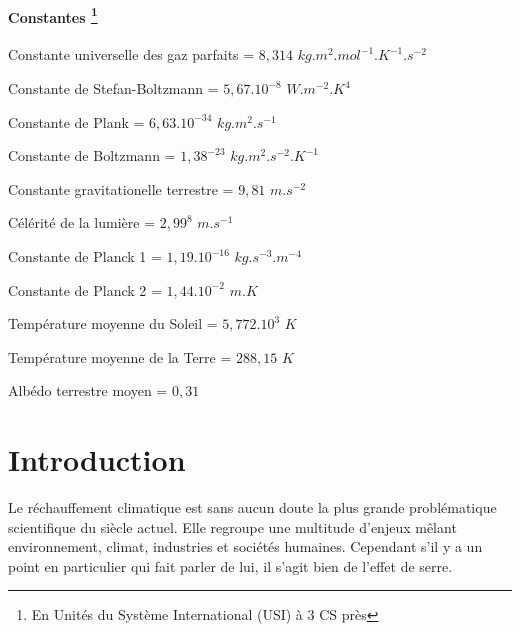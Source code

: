 \documentclass[a4paper, 12pt]{report} %
\begin{document}
\begin{description}
	\subsubsection*{Constantes \footnote{En Unités du Système International (USI) à 3 CS près}}
	\item[\boldmath{$R$}:] Constante universelle des gaz parfaits = $8,314$ $kg.m^2.mol^{-1}.K^{-1}.s^{-2}$
	\item[\boldmath{$\sigma$}:] Constante de Stefan-Boltzmann = $5,67.10^{-8}$ $W.m^{-2}.K^{4}$
	\item[\boldmath{$h$}:] Constante de Plank = $6,63.10^{-34}$ $kg.m^2.s^{-1}$
 	\item[\boldmath{$k_B$}:] Constante de Boltzmann = $1,38^{-23}$ $kg.m^2.s^{-2}.K^{-1}$
  	\item[\boldmath{$g$}:] Constante gravitationelle terrestre = $9,81$ $m.s^{-2}$
   	\item[\boldmath{$c_0$}:] Célérité de la lumière = $2,99^8$ $m.s^{-1}$
    \item[\boldmath{$C_1$}:] Constante de Planck 1 = $1,19.10^{-16}$ $kg.s^{-3}.m^{-4}$
    \item[\boldmath{$C_2$}:] Constante de Planck 2 = $1,44.10^{-2}$ $m.K$
    \item[\boldmath{$T_s$}:] Température moyenne du Soleil = $5,772.10^3$ $K$
    \item[\boldmath{$T_s$}:] Température moyenne de la Terre = $288,15$ $K$
	\item[\boldmath{$\bar{a_T}$}:] Albédo terrestre moyen = $0,31$
\end{description}


\newpage
\chapter*{Introduction}				

\indent Le réchauffement climatique est sans aucun doute la plus grande problématique 
scientifique du siècle actuel. Elle regroupe une multitude d'enjeux mêlant environnement,
climat, industries et sociétés humaines. Cependant s'il y a un point en particulier qui 
fait parler de lui, il s'agit bien de l'effet de serre. \vspace{\baselineskip}
\end{document}
